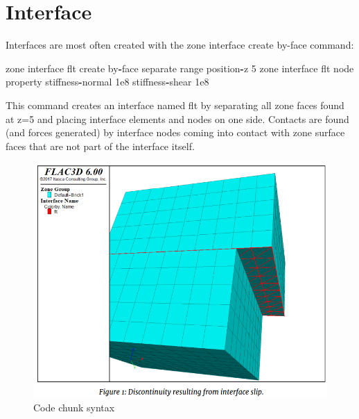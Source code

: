 \documentclass[a4paper, nobind]{templates/ociamthesis}
\newenvironment{Shaded}{\begin{snugshade}}{\end{snugshade}}
\newcommand{\BuiltInTok}[1]{#1}
\newcommand{\DecValTok}[1]{\textcolor[rgb]{0.00,0.00,0.81}{#1}}
\newcommand{\FloatTok}[1]{\textcolor[rgb]{0.00,0.00,0.81}{#1}}
\newcommand{\NormalTok}[1]{#1}
\newcommand{\OperatorTok}[1]{\textcolor[rgb]{0.81,0.36,0.00}{\textbf{#1}}}
\newcommand{\StringTok}[1]{\textcolor[rgb]{0.31,0.60,0.02}{#1}}
\renewenvironment{Shaded}
{
  \vspace{10pt}%
  \begin{snugshade}%
}{%
  \end{snugshade}%
  \vspace{8pt}%
}
\begin{document}
\hypertarget{interface}{%
\section{Interface}\label{interface}}

Interfaces are most often created with the zone interface create by-face
command:

\begin{Shaded}
\begin{Highlighting}[]
\NormalTok{zone interface }\StringTok{\textquotesingle{}flt\textquotesingle{}}\NormalTok{ create by}\OperatorTok{{-}}\NormalTok{face separate }\BuiltInTok{range}\NormalTok{ position}\OperatorTok{{-}}\NormalTok{z }\DecValTok{5}
\NormalTok{zone interface }\StringTok{\textquotesingle{}flt\textquotesingle{}}\NormalTok{ node }\BuiltInTok{property}\NormalTok{ stiffness}\OperatorTok{{-}}\NormalTok{normal }\FloatTok{1e8}\NormalTok{ stiffness}\OperatorTok{{-}}\NormalTok{shear }\FloatTok{1e8}
\end{Highlighting}
\end{Shaded}

This command creates an interface named flt by separating all zone faces
found at z=5 and placing interface elements and nodes on one side.
Contacts are found (and forces generated) by interface nodes coming into
contact with zone surface faces that are not part of the interface
itself.

\begin{figure}[H]
\includegraphics[width=1\linewidth]{myfigureeeeee/k} \caption{Code chunk syntax}\label{fig:unnamed-chunk-63}
\end{figure}
\end{document}
